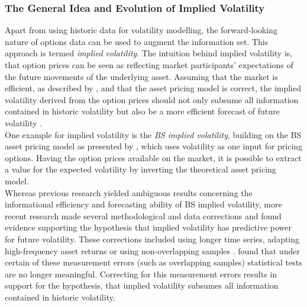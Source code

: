 \subsubsection{The General Idea and Evolution of Implied Volatility}
Apart from using historic data for volatility modelling, the forward-looking nature of options data can be used to augment the information set. This approach is termed \emph{implied volatility}. The intuition behind implied volatility is, that option prices can be seen as reflecting market participants' expectations of the future movements of the underlying asset. Assuming that the market is efficient, as described by \textcite{fama1970}, and that the asset pricing model is correct, the implied volatility derived from the option prices should not only subsume all information contained in historic volatility but also be a more efficient forecast of future volatility \parencite{jiang2003}. \\
One example for implied volatility is the \emph{\ac{BS} implied volatility}, building on the \ac{BS} asset pricing model as presented by \textcite{black1973}, which uses volatility as one input for pricing options. Having the option prices available on the market, it is possible to extract a value for the expected volatility by inverting the theoretical asset pricing model. \\
Whereas previous research yielded ambiguous results concerning the informational efficiency and forecasting ability of \ac{BS} implied volatility, more recent research made several methodological and data corrections and found evidence supporting the hypothesis that implied volatility has predictive power for future volatility. These corrections included using longer time series, adapting high-frequency asset returns or using non-overlapping samples \parencite{jiang2003}. \textcite{christensen2001} found that under certain of these measurement errors (such as overlapping samples) statistical tests are no longer meaningful. Correcting for this measurement errors results in support for the hypothesis, that implied volatility subsumes all information contained in historic volatility.\\

